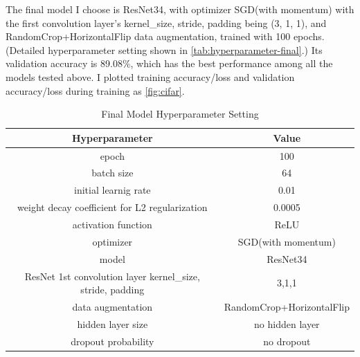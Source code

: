 \documentclass[10pt]{article}
\begin{document}
The final model I choose is ResNet34, with optimizer SGD(with momentum)
with the first convolution layer's kernel\_size, stride, padding being (3, 1, 1),
and RandomCrop+HorizontalFlip data augmentation, trained with 100 epochs. (Detailed hyperparameter setting shown in \autoref{tab:hyperparameter-final}.) Its validation accuracy is 89.08\%, which has the best performance among all the models tested above. I plotted training accuracy/loss and validation accuracy/loss during training as \autoref{fig:cifar}.

\begin{table}[htb]
\centering
\caption{Final Model Hyperparameter Setting}
\begin{tabular}{c|c}
\hline
\textbf{Hyperparameter}   & \textbf{Value}      \\ \hline
epoch     & 100         \\
batch size   & 64         \\
initial learnig rate       & 0.01            \\
weight decay coefficient for L2 regularization      & 0.0005            \\
activation function        & ReLU        \\
optimizer  & SGD(with momentum)  \\
model & ResNet34 \\
ResNet 1st convolution layer kernel\_size, stride, padding & 3,1,1 \\
data augmentation  & RandomCrop+HorizontalFlip  \\
hidden layer size & no hidden layer \\ 
dropout probability & no dropout \\
\hline
\end{tabular}
\label{tab:hyperparameter-final}
\end{table}
\end{document}
